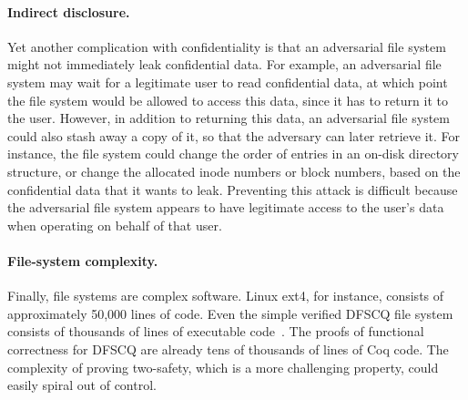 \paragraph{Indirect disclosure.}
Yet another complication with confidentiality is that an adversarial
file system might not immediately leak confidential data.  For example,
an adversarial file system may wait for a legitimate user to read
confidential data, at which point the file system would be allowed to
access this data, since it has to return it to the user.  However, in
addition to returning this data, an adversarial file system could also
stash away a copy of it, so that the adversary can later retrieve it.
For instance, the file system could change the order of entries in an
on-disk directory structure, or change the allocated inode numbers or
block numbers, based on the confidential data that it wants to leak.
Preventing this attack is difficult because the adversarial file system
appears to have legitimate access to the user's data when operating on
behalf of that user.

\paragraph{File-system complexity.}
Finally, file systems are complex software.  Linux ext4, for
instance, consists of approximately 50,000 lines of code.  Even the simple
verified DFSCQ file system consists of thousands of lines of executable
code~\cite{chen:dfscq}.  The proofs of functional correctness for DFSCQ
are already tens of thousands of lines of Coq code.  The complexity of
proving two-safety, which is a more challenging property, could easily
spiral out of control.
